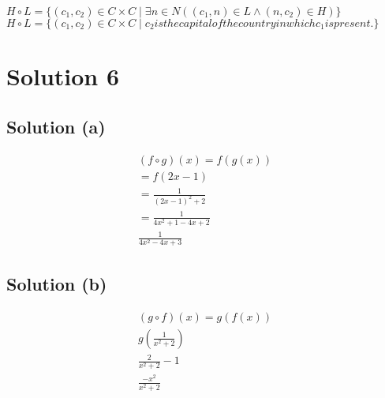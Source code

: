 \documentclass{article}
\begin{document}
$H \circ L = \{(c_1, c_2) \in C \times C \mid \exists n \in N((c_1, n)
\in L \land (n, c_2) \in H)\}$ \\
$H \circ L = \{(c_1,c_2) \in C \times C \mid c_2 is the
capital of the country in which c_1 is present. \}$

\section{Solution 6}
\subsection{Solution (a)}
\begin{align*}
  (f \circ g)(x) = f(g(x)) \\
  = f(2x - 1) \\
  = \frac{1}{(2x - 1)^2 + 2} \\
  = \frac{1}{4x^2 + 1 - 4x + 2} \\
  \frac{1}{4x^2 - 4x + 3} 
\end{align*}
\subsection{Solution (b)}
\begin{align*}
  (g \circ f)(x) = g(f(x)) \\
  g(\frac{1}{x^2 + 2}) \\
  \frac{2}{x^2 + 2} - 1 \\
  \frac{-x^2}{x^2 + 2}
\end{align*}
\end{document}

